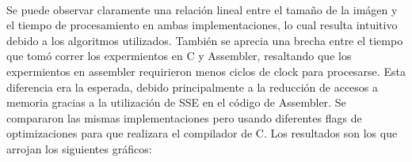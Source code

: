 \documentclass[a4paper]{article}
\begin{document}

\noindent%
\begin{minipage}{\linewidth}%
\end{minipage}
\ \

Se puede observar claramente una relación lineal entre el tamaño de la imágen y el tiempo de procesamiento en ambas implementaciones, lo cual resulta intuitivo debido a los algoritmos utilizados. También se aprecia una brecha entre el tiempo que tomó correr los expermientos en C y Assembler, resaltando que los expermientos en assembler requirieron menos ciclos de clock para procesarse. Esta diferencia era la esperada, debido principalmente a la reducción de accesos a memoria gracias a la utilización de SSE en el código de Assembler. Se compararon las mismas implementaciones pero usando diferentes flags de optimizaciones para que realizara el compilador de C. Los resultados son los que arrojan los siguientes gráficos:
\end{document}
